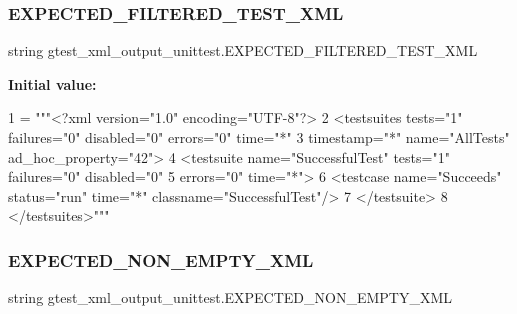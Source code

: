 \subsubsection{\texorpdfstring{E\+X\+P\+E\+C\+T\+E\+D\+\_\+\+F\+I\+L\+T\+E\+R\+E\+D\+\_\+\+T\+E\+S\+T\+\_\+\+X\+ML}{EXPECTED\_FILTERED\_TEST\_XML}}
{\footnotesize\ttfamily string gtest\+\_\+xml\+\_\+output\+\_\+unittest.\+E\+X\+P\+E\+C\+T\+E\+D\+\_\+\+F\+I\+L\+T\+E\+R\+E\+D\+\_\+\+T\+E\+S\+T\+\_\+\+X\+ML}

{\bfseries Initial value\+:}
\begin{DoxyCode}
1 =  \textcolor{stringliteral}{"""<?xml version="1.0" encoding="UTF-8"?>}
2 \textcolor{stringliteral}{<testsuites tests="1" failures="0" disabled="0" errors="0" time="*"}
3 \textcolor{stringliteral}{            timestamp="*" name="AllTests" ad\_hoc\_property="42">}
4 \textcolor{stringliteral}{  <testsuite name="SuccessfulTest" tests="1" failures="0" disabled="0"}
5 \textcolor{stringliteral}{             errors="0" time="*">}
6 \textcolor{stringliteral}{    <testcase name="Succeeds" status="run" time="*" classname="SuccessfulTest"/>}
7 \textcolor{stringliteral}{  </testsuite>}
8 \textcolor{stringliteral}{</testsuites>"""}
\end{DoxyCode}
\mbox{\label{namespacegtest__xml__output__unittest_ab6a01b4b81a702e476f53b1b3c4983c0}} 
\subsubsection{\texorpdfstring{E\+X\+P\+E\+C\+T\+E\+D\+\_\+\+N\+O\+N\+\_\+\+E\+M\+P\+T\+Y\+\_\+\+X\+ML}{EXPECTED\_NON\_EMPTY\_XML}}
{\footnotesize\ttfamily string gtest\+\_\+xml\+\_\+output\+\_\+unittest.\+E\+X\+P\+E\+C\+T\+E\+D\+\_\+\+N\+O\+N\+\_\+\+E\+M\+P\+T\+Y\+\_\+\+X\+ML}

\mbox{\label{namespacegtest__xml__output__unittest_a5591d7d52a46da09d06ed3e9ec18711a}} 
